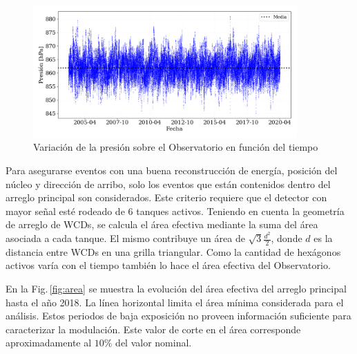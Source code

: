 \begin{figure}[H]
	\centering
		\includegraphics[width=0.9\textwidth]{Graphs/clima/presion_v2.png}
	\caption{Variación de la presión sobre el Observatorio en función del tiempo}
  \label{fig:clima_p}
\end{figure}

Para asegurarse eventos con una buena reconstrucción de  energía, posición del núcleo y dirección de arribo, solo los eventos que están contenidos dentro del arreglo principal son considerados. Este criterio requiere que el detector con mayor señal esté rodeado de 6 tanques activos. Teniendo en cuenta la geometría de arreglo de WCDs, se calcula el área efectiva mediante la suma del área asociada a cada tanque. El mismo contribuye un área de $\sqrt{3} \frac{d^2}{2}$, donde $d$ es la distancia entre WCDs en una grilla triangular. Como la cantidad de hexágonos activos varía con el tiempo también lo hace  el área efectiva del Observatorio. 

En la Fig.\,\ref{fig:area} se muestra la evolución del área efectiva del arreglo principal hasta el año 2018. La línea horizontal  limita el área mínima considerada para el análisis. Estos periodos de baja exposición no proveen información suficiente para caracterizar la modulación.
Este valor de corte en el área corresponde aproximadamente al $10\%$ del valor nominal.


